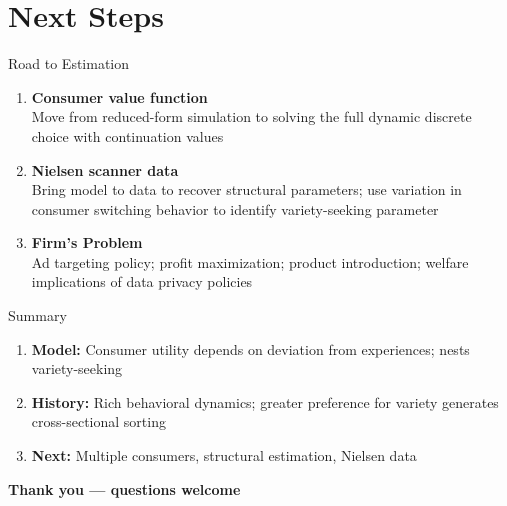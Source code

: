 \documentclass[aspectratio=169,professionalfonts]{beamer}
\newcommand{\hl}[1]{\textbf{\textcolor{UGARed}{#1}}}
\begin{document}
\section{Next Steps}

\begin{frame}{Road to Estimation}
  \begin{enumerate}
    \item \hl{Consumer value function} \\
          Move from reduced-form simulation to solving the full
          dynamic discrete choice with continuation values

    \vspace{4pt}
    \item \hl{Nielsen scanner data} \\
          Bring model to data to recover structural parameters; use
          variation in consumer switching behavior to identify
          variety-seeking parameter

    \vspace{4pt}
    \item \hl{Firm's Problem} \\
          Ad targeting policy; profit maximization; product introduction; welfare implications of data privacy policies 
  \end{enumerate}
\end{frame}


\begin{frame}{Summary}
  \begin{enumerate}
    \item \hl{Model:} Consumer utility depends on deviation from
          experiences; nests variety-seeking 

    \vspace{4pt}
    \item \hl{History:} Rich behavioral dynamics; greater preference for variety 
          generates cross-sectional sorting

    \vspace{4pt}
    \item \hl{Next:} Multiple consumers, structural estimation,
          Nielsen data
  \end{enumerate}

  \vspace{10pt}
  \centering
  \Large\textbf{Thank you --- questions welcome}
\end{frame}
\end{document}
